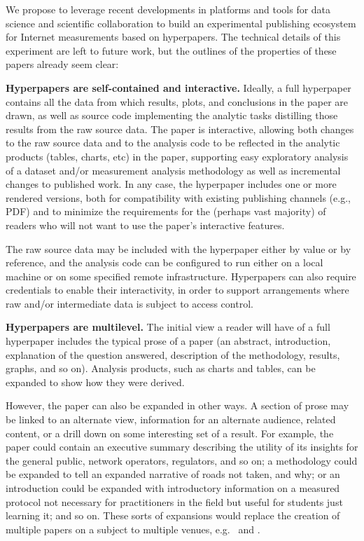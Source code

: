 \documentclass[sigconf]{acmart}
\begin{document}
We propose to leverage recent developments in platforms and tools for data
science and scientific collaboration to build an experimental publishing
ecosystem for Internet measurements based on hyperpapers. The technical details
of this experiment are left to future work, but the outlines of the properties
of these papers already seem clear:

\textbf{Hyperpapers are self-contained and interactive.} Ideally, a full
hyperpaper contains all the data from which results, plots, and conclusions in
the paper are drawn, as well as source code implementing the analytic tasks
distilling those results from the raw source data. The paper is interactive,
allowing both changes to the raw source data and to the analysis code to be
reflected in the analytic products (tables, charts, etc) in the paper,
supporting easy exploratory analysis of a dataset and/or measurement analysis
methodology as well as incremental changes to published work. In any case, the
hyperpaper includes one or more rendered versions, both for compatibility with
existing publishing channels (e.g., PDF) and to minimize the requirements for
the (perhaps vast majority) of readers who will not want to use the paper’s
interactive features.

The raw source data may be included with the hyperpaper either by value or by
reference, and the analysis code can be configured to run either on a local
machine or on some specified remote infrastructure. Hyperpapers can also require
credentials to enable their interactivity, in order to support arrangements
where raw and/or intermediate data is subject to access control.

\textbf{Hyperpapers are multilevel.} The initial view a reader will have of a
full hyperpaper includes the typical prose of a paper (an abstract,
introduction, explanation of the question answered, description of the
methodology, results, graphs, and so on). Analysis products, such as charts and
tables, can be expanded to show how they were derived.

However, the paper can also be expanded in other ways. A section of prose may be
linked to an alternate view, information for an alternate audience, related
content, or a drill down on some interesting set of a result. For example, the
paper could contain an executive summary describing the utility of its insights
for the general public, network operators, regulators, and so on; a methodology
could be expanded to tell an expanded narrative of roads not taken, and why; or
an introduction could be expanded with introductory information on a measured
protocol not necessary for practitioners in the field but useful for students
just learning it; and so on.  These sorts of expansions would replace the
creation of multiple papers on a subject to multiple venues,
e.g.~\cite{Dhamdhere18} and \cite{Clark18}.
\end{document}
